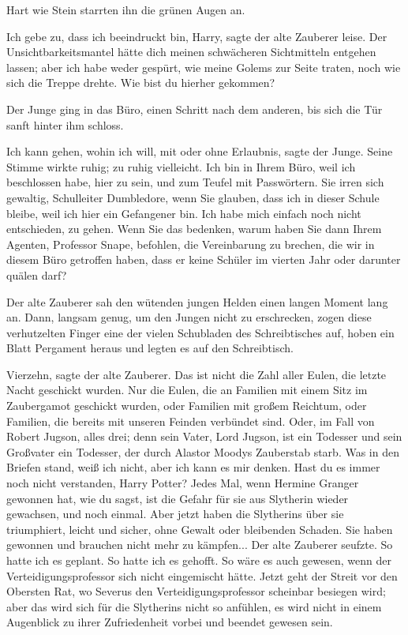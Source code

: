 Hart wie Stein starrten ihn die grünen Augen an.

\glqq Ich gebe zu, dass ich beeindruckt bin, Harry\grqq{}, sagte der alte
Zauberer leise. \glqq Der Unsichtbarkeitsmantel hätte dich meinen schwächeren
Sichtmitteln entgehen lassen; aber ich habe weder gespürt, wie meine Golems zur
Seite traten, noch wie sich die Treppe drehte. Wie bist du hierher
gekommen?\grqq{}

Der Junge ging in das Büro, einen Schritt nach dem anderen, bis sich die Tür
sanft hinter ihm schloss.

\glqq Ich kann gehen, wohin ich will, mit oder ohne Erlaubnis\grqq{}, sagte der
Junge. Seine Stimme wirkte ruhig; zu ruhig vielleicht. \glqq Ich bin in Ihrem
Büro, weil ich beschlossen habe, hier zu sein, und zum Teufel mit Passwörtern.
Sie irren sich gewaltig, Schulleiter Dumbledore, wenn Sie glauben, dass ich in
dieser Schule bleibe, weil ich hier ein Gefangener bin. Ich habe mich einfach
noch nicht entschieden, zu gehen. Wenn Sie das bedenken, warum haben Sie dann
Ihrem Agenten, Professor Snape, befohlen, die Vereinbarung zu brechen, die wir
in diesem Büro getroffen haben, dass er keine Schüler im vierten Jahr oder
darunter quälen darf?\grqq{}

Der alte Zauberer sah den wütenden jungen Helden einen langen Moment lang an.
Dann, langsam genug, um den Jungen nicht zu erschrecken, zogen diese
verhutzelten Finger eine der vielen Schubladen des Schreibtisches auf, hoben ein
Blatt Pergament heraus und legten es auf den Schreibtisch.

\glqq Vierzehn\grqq{}, sagte der alte Zauberer. \glqq Das ist nicht die Zahl
aller Eulen, die letzte Nacht geschickt wurden. Nur die Eulen, die an Familien
mit einem Sitz im Zaubergamot geschickt wurden, oder Familien mit großem
Reichtum, oder Familien, die bereits mit unseren Feinden verbündet sind. Oder,
im Fall von Robert Jugson, alles drei; denn sein Vater, Lord Jugson, ist ein
Todesser und sein Großvater ein Todesser, der durch Alastor Moodys Zauberstab
starb. Was in den Briefen stand, weiß ich nicht, aber ich kann es mir denken.
Hast du es immer noch nicht verstanden, Harry Potter? Jedes Mal, wenn Hermine
Granger gewonnen hat, wie du sagst, ist die Gefahr für sie aus Slytherin wieder
gewachsen, und noch einmal. Aber jetzt haben die Slytherins über sie
triumphiert, leicht und sicher, ohne Gewalt oder bleibenden Schaden. Sie haben
gewonnen und brauchen nicht mehr zu kämpfen...\grqq{} Der alte Zauberer seufzte.
\glqq So hatte ich es geplant. So hatte ich es gehofft. So wäre es auch gewesen,
wenn der Verteidigungsprofessor sich nicht eingemischt hätte. Jetzt geht der
Streit vor den Obersten Rat, wo Severus den Verteidigungsprofessor scheinbar
besiegen wird; aber das wird sich für die Slytherins nicht so anfühlen, es wird
nicht in einem Augenblick zu ihrer Zufriedenheit vorbei und beendet gewesen
sein.\grqq{}

